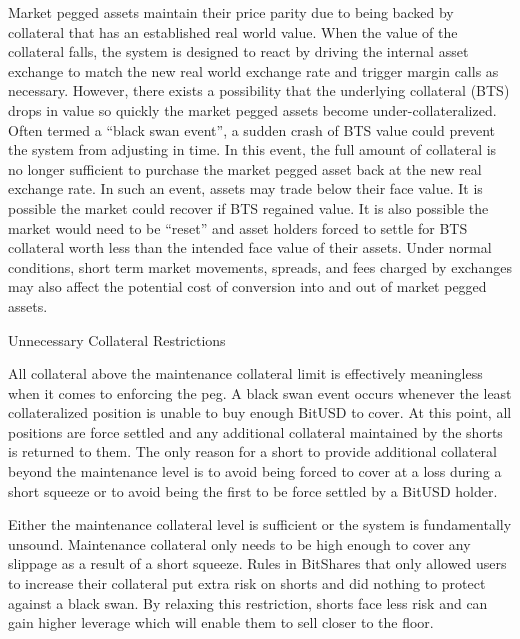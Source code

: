 Market pegged assets maintain their price parity due to being backed by
collateral that has an established real world value. When the value of the
collateral falls, the system is designed to react by driving the internal asset
exchange to match the new real world exchange rate and trigger margin calls as
necessary. However, there exists a possibility that the underlying collateral
(BTS) drops in value so quickly the market pegged assets become
under-collateralized. Often termed a ``black swan event'', a sudden crash of BTS
value could prevent the system from adjusting in time. In this event, the full
amount of collateral is no longer sufficient to purchase the market pegged
asset back at the new real exchange rate. In such an event, assets may trade
below their face value. It is possible the market could recover if BTS regained
value. It is also possible the market would need to be ``reset'' and asset
holders forced to settle for BTS collateral worth less than the intended face
value of their assets. Under normal conditions, short term market movements,
spreads, and fees charged by exchanges may also affect the potential cost of
conversion into and out of market pegged assets.










Unnecessary Collateral Restrictions

All collateral above the maintenance collateral limit is effectively
meaningless when it comes to enforcing the peg. A black swan event occurs
whenever the least collateralized position is unable to buy enough BitUSD to
cover. At this point, all positions are force settled and any additional
collateral maintained by the shorts is returned to them. The only reason for a
short to provide additional collateral beyond the maintenance level is to avoid
being forced to cover at a loss during a short squeeze or to avoid being the
first to be force settled by a BitUSD holder.

Either the maintenance collateral level is sufficient or the system is
fundamentally unsound. Maintenance collateral only needs to be high enough to
cover any slippage as a result of a short squeeze. Rules in BitShares that only
allowed users to increase their collateral put extra risk on shorts and did
nothing to protect against a black swan. By relaxing this restriction, shorts
face less risk and can gain higher leverage which will enable them to sell
closer to the floor.
